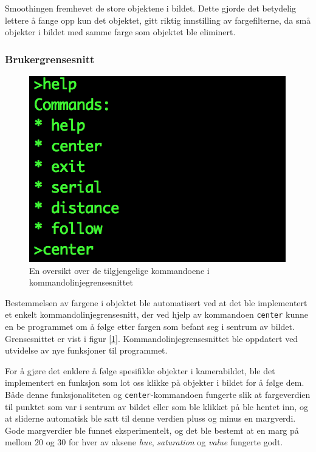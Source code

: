 Smoothingen fremhevet de store objektene i bildet. Dette gjorde det betydelig lettere å fange opp kun det objektet, gitt riktig innstilling av fargefilterne, da små objekter i bildet med samme farge som objektet ble eliminert.

\subsubsection{Brukergrensesnitt}
\begin{figure}
	\centering
	\includegraphics[width=\linewidth]{img/command-menu.png}
	\caption{En oversikt over de tilgjengelige kommandoene i kommandolinjegrensesnittet}
	\label{fig:commandmenu}
\end{figure}
Bestemmelsen av fargene i objektet ble automatisert ved at det ble implementert et enkelt kommandolinjegrensesnitt, der ved hjelp av kommandoen \texttt{center} kunne en be programmet om å følge etter fargen som befant seg i sentrum av bildet. Grensesnittet er vist i figur [\ref{fig:commandmenu}]. Kommandolinjegrensesnittet ble oppdatert ved utvidelse av nye funksjoner til programmet. 

For å gjøre det enklere å følge spesifikke objekter i kamerabildet, ble det implementert en funksjon som lot oss klikke på objekter i bildet for å følge dem. Både denne funksjonaliteten og \texttt{center}-kommandoen fungerte slik at fargeverdien til punktet som var i sentrum av bildet eller som ble klikket på ble hentet inn, og at sliderne automatisk ble satt til denne verdien pluss og minus en margverdi. Gode margverdier ble funnet eksperimentelt, og det ble bestemt at en marg på mellom $20$ og $30$ for hver av aksene \emph{hue}, \emph{saturation} og \emph{value} fungerte godt.

